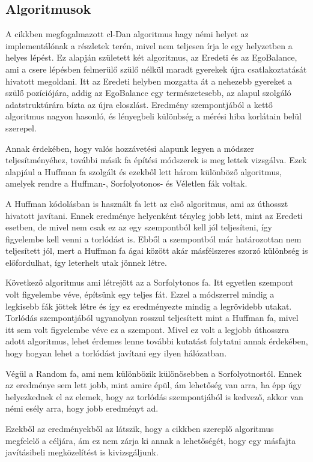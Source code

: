 \documentclass[12pt]{report}
\begin{document}
\subsection{Algoritmusok}

A cikkben megfogalmazott cl-Dan algoritmus hagy némi helyet az implementálónak a részletek terén, mivel nem teljesen írja le egy helyzetben a helyes lépést.
Ez alapján született két algoritmus, az Eredeti és az EgoBalance, ami a csere lépésben felmerülő szülő nélkül maradt gyerekek újra csatlakoztatását hivatott megoldani.
Itt az Eredeti helyben mozgatta át a nehezebb gyereket a szülő pozíciójára, addig az EgoBalance egy természetesebb, az alapul szolgáló adatstruktúrára bízta az újra eloszlást.
Eredmény szempontjából a kettő algoritmus nagyon hasonló, és lényegbeli különbség a mérési hiba korlátain belül szerepel.

Annak érdekében, hogy valós hozzávetési alapunk legyen a módszer teljesítményéhez, további másik fa építési módszerek is meg lettek vizsgálva.
Ezek alapjául a Huffman fa szolgált és ezekből lett három különböző algoritmus, amelyek rendre a Huffman-, Sorfolyotonos- és Véletlen fák voltak.

A Huffman kódolásban is használt fa lett az első algoritmus, ami az úthosszt hivatott javítani.
Ennek eredménye helyenként tényleg jobb lett, mint az Eredeti esetben, de mivel nem csak ez az egy szempontból kell jól teljesíteni, így figyelembe kell venni a torlódást is.
Ebből a szempontból már határozottan nem teljesített jól, mert a Huffman fa ágai között akár másfélszeres szorzó különbség is előfordulhat, így leterhelt utak jönnek létre. 

Következő algoritmus ami létrejött az a Sorfolytonos fa.
Itt egyetlen szempont volt figyelembe véve, építsünk egy teljes fát.
Ezzel a módszerrel mindig a legkisebb fák jöttek létre és így ez eredményezte mindig a legrövidebb utakat.
Torlódás szempontjából ugyanolyan rosszul teljesített mint a Huffman fa, mivel itt sem volt figyelembe véve ez a szempont.
Mivel ez volt a legjobb úthosszra adott algoritmus, lehet érdemes lenne további kutatást folytatni annak érdekében, hogy hogyan lehet a torlódást javítani egy ilyen hálózatban.

Végül a Random fa, ami nem különbözik különösebben a Sorfolyotnostól.
Ennek az eredménye sem lett jobb, mint amire épül, ám lehetőség van arra, ha épp úgy helyezkednek el az elemek, hogy az torlódás szempontjából is kedvező, akkor van némi esély arra, hogy jobb eredményt ad.

Ezekből az eredményekből az látszik, hogy a cikkben szereplő algoritmus megfelelő a céljára, ám ez nem zárja ki annak a lehetőségét, hogy egy másfajta javításibeli megközelítést is kivizsgáljunk. 
\end{document}
